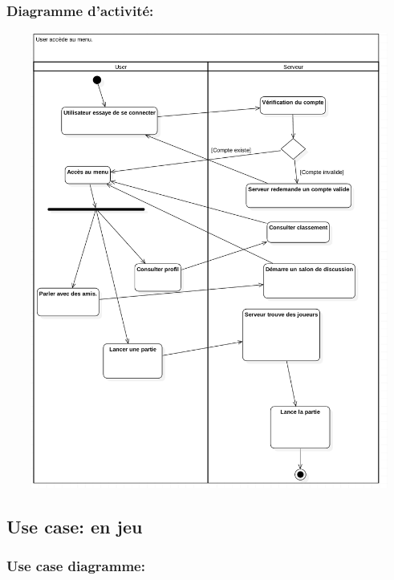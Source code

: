 \documentclass[10pt,a4paper]{article}
\begin{document}
\newpage
\subsubsection{Diagramme d'activité:}

\begin{center}
    \includegraphics[height=15cm,width=15cm]{user_serveur_diagramme.png}
\end{center}
   
\newpage
\subsection{Use case: en jeu}

\subsubsection{Use case diagramme:}
\end{document}
